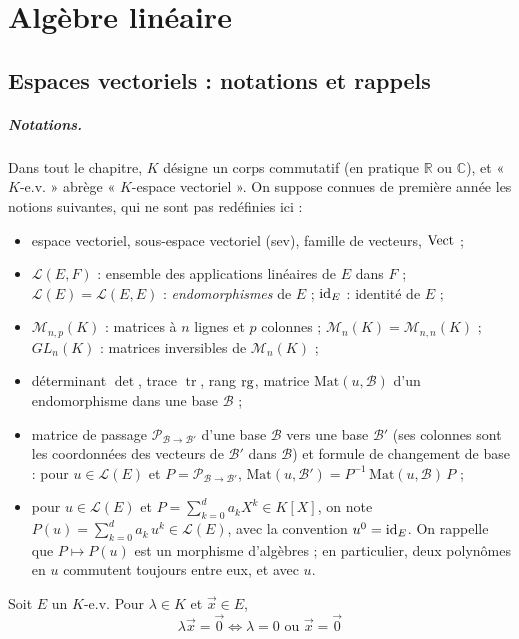 \chapter{Algèbre linéaire}
\label{chap:algebre-lineaire}

\section{Espaces vectoriels : notations et rappels}

\paragraph{Notations.} Dans tout le chapitre, $K$ désigne un corps commutatif (en pratique $\mathbb{R}$ ou $\mathbb{C}$), et « $K$-e.v. » abrège « $K$-espace vectoriel ». On suppose connues de première année les notions suivantes, qui ne sont pas redéfinies ici :
\begin{itemize}
\item espace vectoriel, sous-espace vectoriel (sev), famille de vecteurs, $\operatorname{Vect}$ ;
\item $\mathcal{L}(E,F)$ : ensemble des applications linéaires de $E$ dans $F$ ; $\mathcal{L}(E)=\mathcal{L}(E,E)$ : \emph{endomorphismes} de $E$ ; $\operatorname{id}_E$ : identité de $E$ ;
\item $\mathcal{M}_{n,p}(K)$ : matrices à $n$ lignes et $p$ colonnes ; $\mathcal{M}_n(K)=\mathcal{M}_{n,n}(K)$ ; $GL_n(K)$ : matrices inversibles de $\mathcal{M}_n(K)$ ;
\item déterminant $\det$, trace $\operatorname{tr}$, rang $\operatorname{rg}$, matrice $\mathrm{Mat}(u,\mathcal{B})$ d'un endomorphisme dans une base $\mathcal{B}$ ;
\item matrice de passage $\mathcal{P}_{\mathcal{B}\to\mathcal{B}'}$ d'une base $\mathcal{B}$ vers une base $\mathcal{B}'$ (ses colonnes sont les coordonnées des vecteurs de $\mathcal{B}'$ dans $\mathcal{B}$) et formule de changement de base : pour $u\in\mathcal{L}(E)$ et $P=\mathcal{P}_{\mathcal{B}\to\mathcal{B}'}$, $\mathrm{Mat}(u,\mathcal{B}')=P^{-1}\,\mathrm{Mat}(u,\mathcal{B})\,P$ ;
\item pour $u\in\mathcal{L}(E)$ et $P=\sum_{k=0}^d a_kX^k \in K[X]$, on note $P(u)=\sum_{k=0}^d a_k\,u^k \in \mathcal{L}(E)$, avec la convention $u^0=\operatorname{id}_E$. On rappelle que $P\mapsto P(u)$ est un morphisme d'algèbres ; en particulier, deux polynômes en $u$ commutent toujours entre eux, et avec $u$.
\end{itemize}

\begin{prop}
\label{prop:lambda-x-nul}
Soit $E$ un $K$-e.v. Pour $\lambda\in K$ et $\vec{x}\in E$,
\[\lambda \vec{x} = \vec{0} \iff \lambda=0 \text{ ou } \vec{x}=\vec{0}\]
\end{prop}

